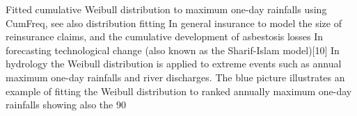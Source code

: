 Fitted cumulative Weibull distribution to maximum one-day rainfalls using CumFreq, see also distribution fitting
In general insurance to model the size of reinsurance claims, and the cumulative development of asbestosis losses
In forecasting technological change (also known as the Sharif-Islam model)[10]
In hydrology the Weibull distribution is applied to extreme events such as annual maximum one-day rainfalls and river discharges. The blue picture illustrates an example of fitting the Weibull distribution to ranked annually maximum one-day rainfalls showing also the 90%

